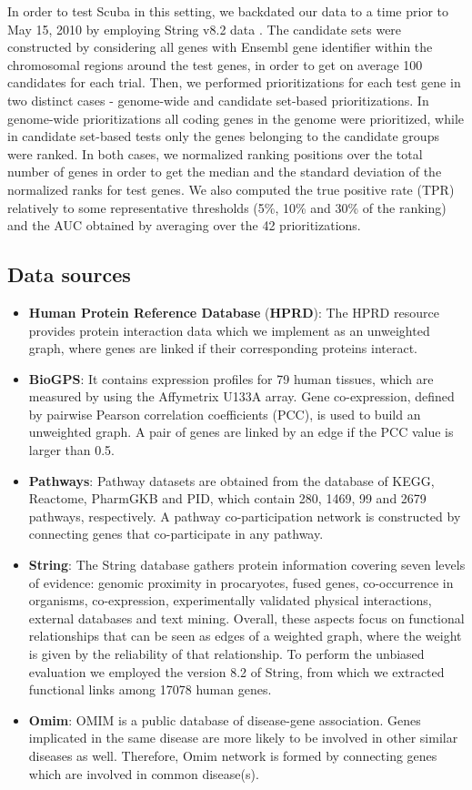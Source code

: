 In order to test Scuba in this setting, we backdated our data to a time prior to May 15, 2010 by employing String v8.2 data \cite{string}. The candidate sets were constructed by considering all genes with Ensembl \cite{ensembl} gene identifier within the chromosomal regions around the test genes, in order to get on average 100 candidates for each trial. Then, we performed prioritizations for each test gene in two distinct cases - genome-wide and candidate set-based prioritizations. In genome-wide prioritizations all coding genes in the genome were prioritized, while in candidate set-based tests only the genes belonging to the candidate groups were ranked. In both cases, we normalized ranking positions over the total number of genes in order to get the median and the standard deviation of the normalized ranks for test genes. We also computed the true positive rate (TPR) relatively to some representative thresholds (5\%, 10\% and 30\% of the ranking) and the AUC obtained by averaging over the 42 prioritizations.

\subsection*{Data sources}
\begin{itemize}
	\item \textbf{Human Protein Reference Database} (\textbf{HPRD}): The HPRD resource provides protein interaction data which we implement as an unweighted graph, where genes are linked if their corresponding proteins interact.
	\item \textbf{BioGPS}: It contains expression profiles for 79 human tissues, which are measured by using the Affymetrix U133A array. Gene co-expression, defined by pairwise Pearson correlation coefficients (PCC), is used to build an unweighted graph. A pair of genes are linked by an edge if the PCC value is larger than 0.5.
	\item \textbf{Pathways}: Pathway datasets are obtained from the database of KEGG, Reactome, PharmGKB and PID, which contain 280, 1469, 99 and 2679 pathways, respectively. A pathway co-participation network is constructed by connecting genes that co-participate in any pathway.
	\item \textbf{String}: The String database gathers protein information covering seven levels of evidence: genomic proximity in procaryotes, fused genes, co-occurrence in organisms, co-expression, experimentally validated physical interactions, external databases and text mining. Overall, these aspects focus on functional relationships that can be seen as edges of a weighted graph, where the weight is given by the reliability of that relationship. To perform the unbiased evaluation we employed the version 8.2 of String, from which we extracted functional links among 17078 human genes.
	\item \textbf{Omim}: OMIM is a public database of disease-gene association. Genes
implicated in the same disease are more likely to be involved in other
similar diseases as well. Therefore, Omim network is formed by connecting genes which are involved in common disease(s).
\end{itemize}
